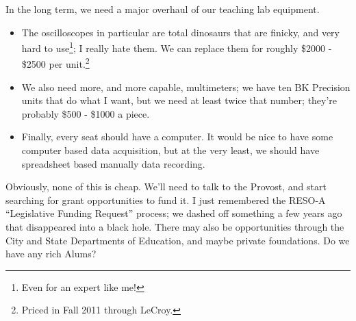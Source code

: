 \documentclass[12pt]{article}
\begin{document}
In the long term, we need a major overhaul of our teaching lab
equipment.
\begin{itemize}
\item The oscilloscopes in particular are total dinosaurs that are
  finicky, and very hard to use\footnote{Even for an expert like me!};
  I really hate them.  We can replace them for roughly \$2000 - \$2500
  per unit.\footnote{Priced in Fall 2011 through LeCroy.}
\item We also need more, and more capable, multimeters; we have ten BK
  Precision units that do what I want, but we need at least twice that
  number; they're probably \$500 - \$1000 a piece.
\item Finally, every seat should have a computer.  It would be nice to
  have some computer based data acquisition, but at the very least, we
  should have spreadsheet based manually data recording.
\end{itemize}
Obviously, none of this is cheap.  We'll need to talk to the Provost,
and start searching for grant opportunities to fund it.  I just
remembered the RESO-A ``Legislative Funding Request'' process; we
dashed off something a few years ago that disappeared into a black
hole.  There may also be opportunities through the City and State
Departments of Education, and maybe private foundations.  Do we have
any rich Alums?
\end{document}
